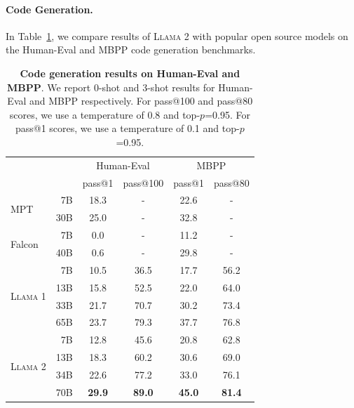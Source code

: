 \documentclass{article}
\newcommand{\anise}{\textsc{Llama 1}\xspace}
\newcommand{\cinnamon}{\textsc{Llama 2}\xspace}
\begin{document}
\paragraph{Code Generation.} In Table~\ref{tab:code}, we compare results of \cinnamon with popular open source models on the Human-Eval and MBPP code generation benchmarks. 
 \begin{table}[htbp]
  \centering
  \setlength{\tabcolsep}{5pt}
  \begin{tabular}{lrcc|cc}
  \toprule
  & & \multicolumn{2}{c}{Human-Eval} & \multicolumn{2}{c}{MBPP} \\
  & & pass@1 & pass@100 & pass@1 & pass@80 \\
  \midrule
  \multirow{2}{*}{MPT}
    & 7B & 18.3 & - &  22.6 & - \\
    & 30B & 25.0 & - & 32.8 & - \\
  \midrule    
  \multirow{2}{*}{Falcon}
    & 7B & 0.0 & - & 11.2 & - \\
    & 40B & 0.6 & - & 29.8 & - \\    
  \midrule      
  \multirow{4}{*}{\anise}
    & 7B & 10.5 & 36.5 & 17.7 & 56.2 \\
    & 13B & 15.8 & 52.5 & 22.0 & 64.0 \\    
    & 33B & 21.7 & 70.7 & 30.2 & 73.4 \\ 
    & 65B & 23.7 & 79.3 & 37.7 & 76.8 \\ 
  \midrule
  \multirow{4}{*}{\cinnamon}
    & 7B & 12.8 & 45.6 & 20.8 & 62.8\\
    & 13B & 18.3 & 60.2 & 30.6 & 69.0\\    
    & 34B & 22.6 & 77.2 & 33.0 & 76.1\\ 
    & 70B & \bf{29.9} & \bf{89.0} & \bf{45.0} & \bf{81.4}\\
  \bottomrule
  \end{tabular}
  \caption{\textbf{Code generation results on Human-Eval and MBPP}. We report 0-shot and 3-shot results for Human-Eval and MBPP respectively. For pass@100 and pass@80 scores, we use a temperature of 0.8 and top-$p$=0.95. For pass@1 scores, we use a temperature of 0.1 and top-$p$=0.95.
  \label{tab:code}
  }
\end{table}
\end{document}
